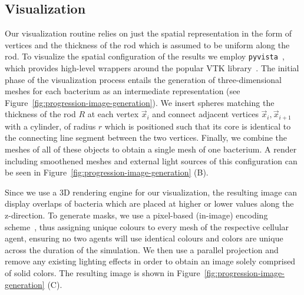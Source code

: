 \subsection{Visualization}
\label{subsection:visualization}
Our visualization routine relies on just the spatial representation in the form of
vertices and the
thickness of the rod which is assumed to be uniform along the rod.
To visualize the spatial configuration of the results we employ
\texttt{pyvista}~\cite{sullivan2019pyvista}, which provides
high-level wrappers around the popular VTK library~\cite{vtkBook,Sullivan2019}.
The initial phase of the visualization process entails the generation of
three-dimensional meshes
for each bacterium as an intermediate representation (see
Figure~\ref{fig:progression-image-generation}).
We insert spheres matching the thickness of the rod $R$ at each vertex $\vec{x}_i$ and connect
adjacent vertices $\vec{x}_i,\vec{x}_{i+1}$ with a cylinder, of radius $r$ which is positioned
such that its core is identical to the connecting line segment between the two vertices.
Finally, we combine the meshes of all of these objects to obtain a single mesh of one bacterium.
A render including smoothened meshes and external light sources of this configuration
can be seen in
Figure~\ref{fig:progression-image-generation} (B).

Since we use a 3D rendering engine for our visualization, the resulting image can display
overlaps of bacteria which are placed at higher or lower values along the z-direction.
To generate masks, we use a pixel-based (in-image) encoding scheme~\cite{JianboShi2000}, thus
assigning unique colours to every mesh of the respective cellular agent, ensuring no two agents
will use identical colours and colors are unique across the duration of the simulation.
We then use a parallel projection and remove any existing lighting effects in order to obtain an
image solely comprised of solid colors.
The resulting image is shown in Figure~\ref{fig:progression-image-generation} (C).

